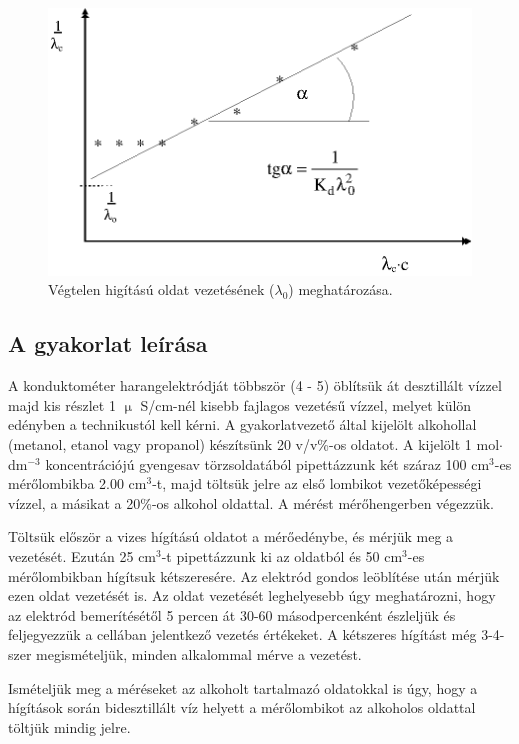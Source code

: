 \begin{figure}
\centering
\includegraphics{lambda0.eps}
\caption{Végtelen higítású oldat vezetésének ($\lambda_0$) meghatározása.}
\label{fig:}
\end{figure}

\subsection{A gyakorlat leírása}

A konduktométer harangelektródját többször (4 - 5) öblítsük át desztillált vízzel majd kis részlet 1 $\upmu$ S/cm-nél kisebb fajlagos vezetésű vízzel, melyet külön edényben a technikustól kell kérni.
A gyakorlatvezető által kijelölt alkohollal (metanol, etanol vagy propanol) készítsünk 20 v/v\%-os oldatot.
A kijelölt 1 mol$\cdot$dm$^{-3}$ koncentrációjú gyengesav törzsoldatából pipettázzunk két száraz 100 cm$^3$-es mérőlombikba 2.00 cm$^3$-t, majd töltsük jelre az első lombikot vezetőképességi vízzel, a másikat a 20\%-os alkohol oldattal.
A mérést mérőhengerben végezzük.

Töltsük először a vizes hígítású oldatot a mérőedénybe, és mérjük meg a vezetését.
Ezután 25 cm$^3$-t pipettázzunk ki az oldatból és 50 cm$^3$-es mérőlombikban hígítsuk kétszeresére.
Az elektród gondos leöblítése után mérjük ezen oldat vezetését is.
Az oldat vezetését leghelyesebb úgy meghatározni, hogy az elektród bemerítésétől 5 percen át 30-60 másodpercenként észleljük és feljegyezzük a cellában jelentkező vezetés értékeket.
A kétszeres hígítást még 3-4-szer megismételjük, minden alkalommal mérve a vezetést.

Ismételjük meg a méréseket az alkoholt tartalmazó oldatokkal is úgy, hogy a hígítások során bidesztillált víz helyett a mérőlombikot az alkoholos oldattal töltjük mindig jelre.

